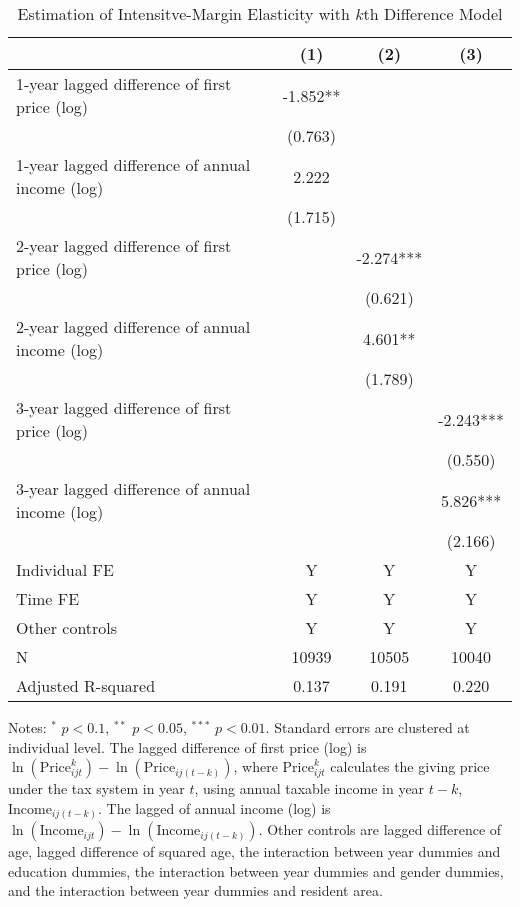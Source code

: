 \documentclass[
  11pt,
  a4paper,
]{article}
\begin{document}
\begin{table}

\caption{\label{tab:kdiffIntensive}Estimation of Intensitve-Margin Elasticity with $k$th Difference Model}
\centering
\fontsize{7}{9}\selectfont
\begin{threeparttable}
\begin{tabular}[t]{lccc}
\toprule
 & (1) & (2) & (3)\\
\midrule
1-year lagged difference of first price (log) & -1.852** &  & \\
 & (0.763) &  & \\
1-year lagged difference of annual income (log) & 2.222 &  & \\
 & (1.715) &  & \\
2-year lagged difference of first price (log) &  & -2.274*** & \\
 &  & (0.621) & \\
2-year lagged difference of annual income (log) &  & 4.601** & \\
 &  & (1.789) & \\
3-year lagged difference of first price (log) &  &  & -2.243***\\
 &  &  & (0.550)\\
3-year lagged difference of annual income (log) &  &  & 5.826***\\
 &  &  & (2.166)\\
Individual FE & Y & Y & Y\\
Time FE & Y & Y & Y\\
Other controls & Y & Y & Y\\
N & 10939 & 10505 & 10040\\
Adjusted R-squared & 0.137 & 0.191 & 0.220\\
\bottomrule
\end{tabular}
\begin{tablenotes}
\item Notes: $^{*}$ $p < 0.1$, $^{**}$ $p < 0.05$, $^{***}$ $p < 0.01$. Standard errors are clustered at individual level. The lagged difference of first price (log) is $\ln(\text{Price}^k_{ijt}) - \ln(\text{Price}_{ij(t-k)})$, where $\text{Price}^k_{ijt}$ calculates the giving price under the tax system in year $t$, using annual taxable income in year $t-k$, $\text{Income}_{ij(t-k)}$. The lagged of annual income (log) is $\ln(\text{Income}_{ijt}) - \ln(\text{Income}_{ij(t-k)})$. Other controls are lagged difference of age, lagged difference of squared age, the interaction between year dummies and education dummies, the interaction between year dummies and gender dummies, and the interaction between year dummies and resident area.
\end{tablenotes}
\end{threeparttable}
\end{table}
\end{document}
